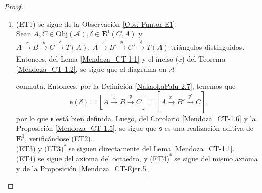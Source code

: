 \documentclass[tesis]{subfiles}
\begin{document}
\begin{proof}\leavevmode

    \begin{enumerate}[label=(\alph*)]
    
        \item (ET1) se sigue de la Observación \ref{Obs: Funtor E1}. \\

            Sean $A,C\in\text{Obj}(\mathscr{A}), \delta\in\mathbf{E}^1(C,A)$ y $A\xrightarrow[]{x} B\xrightarrow[]{y} C\xrightarrow[]{\delta} T(A), \ A\xrightarrow[]{x'} B'\xrightarrow[]{y'} C'\xrightarrow[]{\delta} T(A)$ triángulos distinguidos. Entonces, del Lema \ref{Mendoza_CT-1.1} y el inciso (c) del Teorema \ref{Mendoza_CT-1.2}, se sigue que el diagrama en $\mathscr{A}$
            \begin{center}
            \end{center}
            conmuta. Entonces, por la Definición \ref{NakaokaPalu-2.7}, tenemos que
            \[
                \mathfrak{s}(\delta) = [A\xrightarrow[]{x} B\xrightarrow[]{y} C] = [A\xrightarrow[]{x'} B'\xrightarrow[]{y'} C],
            \] 
            por lo que $\mathfrak{s}$ está bien definida. Luego, del Corolario \ref{Mendoza_CT-1.6} y la Proposición \ref{Mendoza_CT-1.5}, se sigue que $\mathfrak{s}$ es una realización aditiva de $\mathbf{E}^1$, verificándose (ET2). \\

        (ET3) y (ET3)\textsuperscript{$\ast$} se siguen directamente del Lema \ref{Mendoza_CT-1.1}. \\

        (ET4) se sigue del axioma del octaedro, y (ET4)\textsuperscript{$\ast$} se sigue del mismo axioma y de la Proposición \ref{Mendoza_CT-Ejer.5}. \\


\end{enumerate}
\end{proof}
\end{document}
